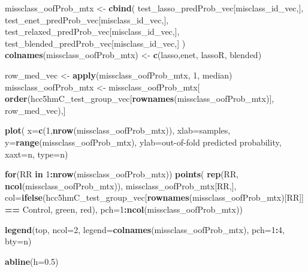 \documentclass[
]{book}
\newenvironment{Shaded}{\begin{snugshade}}{\end{snugshade}}
\newcommand{\ControlFlowTok}[1]{\textcolor[rgb]{0.13,0.29,0.53}{\textbf{#1}}}
\newcommand{\DataTypeTok}[1]{\textcolor[rgb]{0.13,0.29,0.53}{#1}}
\newcommand{\DecValTok}[1]{\textcolor[rgb]{0.00,0.00,0.81}{#1}}
\newcommand{\FloatTok}[1]{\textcolor[rgb]{0.00,0.00,0.81}{#1}}
\newcommand{\KeywordTok}[1]{\textcolor[rgb]{0.13,0.29,0.53}{\textbf{#1}}}
\newcommand{\NormalTok}[1]{#1}
\newcommand{\OperatorTok}[1]{\textcolor[rgb]{0.81,0.36,0.00}{\textbf{#1}}}
\newcommand{\StringTok}[1]{\textcolor[rgb]{0.31,0.60,0.02}{#1}}
\begin{document}
\begin{Shaded}
\begin{Highlighting}[]
\NormalTok{missclass\_oofProb\_mtx <{-}}\StringTok{ }\KeywordTok{cbind}\NormalTok{(}
\NormalTok{ test\_lasso\_predProb\_vec[misclass\_id\_vec,],}
\NormalTok{ test\_enet\_predProb\_vec[misclass\_id\_vec,],}
\NormalTok{ test\_relaxed\_predProb\_vec[misclass\_id\_vec,],}
\NormalTok{ test\_blended\_predProb\_vec[misclass\_id\_vec,]}
\NormalTok{)}
\KeywordTok{colnames}\NormalTok{(missclass\_oofProb\_mtx) <{-}}\StringTok{ }\KeywordTok{c}\NormalTok{(}\StringTok{\textquotesingle{}lasso\textquotesingle{}}\NormalTok{,}\StringTok{\textquotesingle{}enet\textquotesingle{}}\NormalTok{, }\StringTok{\textquotesingle{}lassoR\textquotesingle{}}\NormalTok{, }\StringTok{\textquotesingle{}blended\textquotesingle{}}\NormalTok{)}

\NormalTok{row\_med\_vec <{-}}\StringTok{ }\KeywordTok{apply}\NormalTok{(missclass\_oofProb\_mtx, }\DecValTok{1}\NormalTok{, median)}
\NormalTok{missclass\_oofProb\_mtx <{-}}\StringTok{ }\NormalTok{missclass\_oofProb\_mtx[}
  \KeywordTok{order}\NormalTok{(hcc5hmC\_test\_group\_vec[}\KeywordTok{rownames}\NormalTok{(missclass\_oofProb\_mtx)], row\_med\_vec),]}

\KeywordTok{plot}\NormalTok{(}
 \DataTypeTok{x=}\KeywordTok{c}\NormalTok{(}\DecValTok{1}\NormalTok{,}\KeywordTok{nrow}\NormalTok{(missclass\_oofProb\_mtx)), }\DataTypeTok{xlab=}\StringTok{\textquotesingle{}samples\textquotesingle{}}\NormalTok{,}
 \DataTypeTok{y=}\KeywordTok{range}\NormalTok{(missclass\_oofProb\_mtx), }\DataTypeTok{ylab=}\StringTok{\textquotesingle{}out{-}of{-}fold predicted probability\textquotesingle{}}\NormalTok{,}
 \DataTypeTok{xaxt=}\StringTok{\textquotesingle{}n\textquotesingle{}}\NormalTok{, }\DataTypeTok{type=}\StringTok{\textquotesingle{}n\textquotesingle{}}\NormalTok{)}

\ControlFlowTok{for}\NormalTok{(RR }\ControlFlowTok{in} \DecValTok{1}\OperatorTok{:}\KeywordTok{nrow}\NormalTok{(missclass\_oofProb\_mtx))}
\KeywordTok{points}\NormalTok{(}
 \KeywordTok{rep}\NormalTok{(RR, }\KeywordTok{ncol}\NormalTok{(missclass\_oofProb\_mtx)), }
\NormalTok{ missclass\_oofProb\_mtx[RR,],}
 \DataTypeTok{col=}\KeywordTok{ifelse}\NormalTok{(hcc5hmC\_test\_group\_vec[}\KeywordTok{rownames}\NormalTok{(missclass\_oofProb\_mtx)[RR]] }\OperatorTok{==}\StringTok{ \textquotesingle{}Control\textquotesingle{}}\NormalTok{,}
  \StringTok{\textquotesingle{}green\textquotesingle{}}\NormalTok{, }\StringTok{\textquotesingle{}red\textquotesingle{}}\NormalTok{),}
 \DataTypeTok{pch=}\DecValTok{1}\OperatorTok{:}\KeywordTok{ncol}\NormalTok{(missclass\_oofProb\_mtx))}

\KeywordTok{legend}\NormalTok{(}\StringTok{\textquotesingle{}top\textquotesingle{}}\NormalTok{, }\DataTypeTok{ncol=}\DecValTok{2}\NormalTok{, }\DataTypeTok{legend=}\KeywordTok{colnames}\NormalTok{(missclass\_oofProb\_mtx), }
 \DataTypeTok{pch=}\DecValTok{1}\OperatorTok{:}\DecValTok{4}\NormalTok{, }\DataTypeTok{bty=}\StringTok{\textquotesingle{}n\textquotesingle{}}\NormalTok{)}

\KeywordTok{abline}\NormalTok{(}\DataTypeTok{h=}\FloatTok{0.5}\NormalTok{)}
\end{Highlighting}
\end{Shaded}
\end{document}
